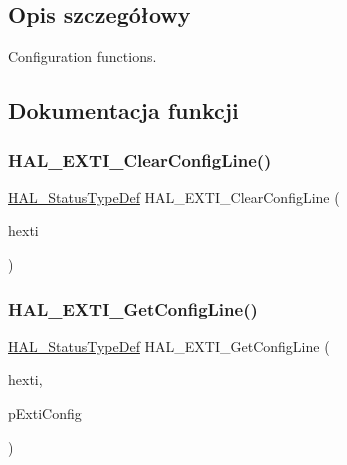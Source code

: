 \subsection{Opis szczegółowy}
Configuration functions. 



\subsection{Dokumentacja funkcji}
\mbox{\label{group___e_x_t_i___exported___functions___group1_gae8ed1defdcf965a62618af09c45c7866}} 
\subsubsection{\texorpdfstring{H\+A\+L\+\_\+\+E\+X\+T\+I\+\_\+\+Clear\+Config\+Line()}{HAL\_EXTI\_ClearConfigLine()}}
{\footnotesize\ttfamily \hyperlink{stm32f4xx__hal__def_8h_a63c0679d1cb8b8c684fbb0632743478f}{H\+A\+L\+\_\+\+Status\+Type\+Def} H\+A\+L\+\_\+\+E\+X\+T\+I\+\_\+\+Clear\+Config\+Line (\begin{DoxyParamCaption}\item[{\hyperlink{struct_e_x_t_i___handle_type_def}{E\+X\+T\+I\+\_\+\+Handle\+Type\+Def} $\ast$}]{hexti }\end{DoxyParamCaption})}

\mbox{\label{group___e_x_t_i___exported___functions___group1_gabc6617165a2712df438f38509c8205dd}} 
\subsubsection{\texorpdfstring{H\+A\+L\+\_\+\+E\+X\+T\+I\+\_\+\+Get\+Config\+Line()}{HAL\_EXTI\_GetConfigLine()}}
{\footnotesize\ttfamily \hyperlink{stm32f4xx__hal__def_8h_a63c0679d1cb8b8c684fbb0632743478f}{H\+A\+L\+\_\+\+Status\+Type\+Def} H\+A\+L\+\_\+\+E\+X\+T\+I\+\_\+\+Get\+Config\+Line (\begin{DoxyParamCaption}\item[{\hyperlink{struct_e_x_t_i___handle_type_def}{E\+X\+T\+I\+\_\+\+Handle\+Type\+Def} $\ast$}]{hexti,  }\item[{\hyperlink{struct_e_x_t_i___config_type_def}{E\+X\+T\+I\+\_\+\+Config\+Type\+Def} $\ast$}]{p\+Exti\+Config }\end{DoxyParamCaption})}

